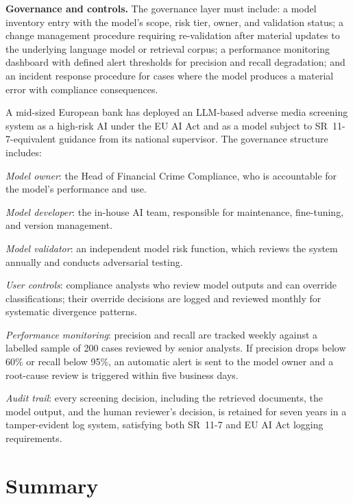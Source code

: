 \textbf{Governance and controls.} The governance layer must include: a model inventory entry with the model's scope, risk tier, owner, and validation status; a change management procedure requiring re-validation after material updates to the underlying language model or retrieval corpus; a performance monitoring dashboard with defined alert thresholds for precision and recall degradation; and an incident response procedure for cases where the model produces a material error with compliance consequences.

\begin{example}
\label{ex:mrm-llm-ams}
A mid-sized European bank has deployed an LLM-based adverse media screening system as a high-risk AI under the EU AI Act and as a model subject to SR~11-7-equivalent guidance from its national supervisor. The governance structure includes:

\emph{Model owner}: the Head of Financial Crime Compliance, who is accountable for the model's performance and use.

\emph{Model developer}: the in-house AI team, responsible for maintenance, fine-tuning, and version management.

\emph{Model validator}: an independent model risk function, which reviews the system annually and conducts adversarial testing.

\emph{User controls}: compliance analysts who review model outputs and can override classifications; their override decisions are logged and reviewed monthly for systematic divergence patterns.

\emph{Performance monitoring}: precision and recall are tracked weekly against a labelled sample of 200 cases reviewed by senior analysts. If precision drops below 60\% or recall below 95\%, an automatic alert is sent to the model owner and a root-cause review is triggered within five business days.

\emph{Audit trail}: every screening decision, including the retrieved documents, the model output, and the human reviewer's decision, is retained for seven years in a tamper-evident log system, satisfying both SR~11-7 and EU AI Act logging requirements.
\end{example}

\section{Summary}
\label{sec:ch11-summary}

